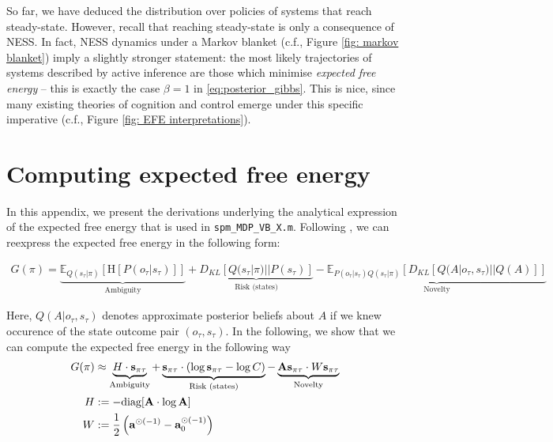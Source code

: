 \documentclass{article}
\begin{document}
So far, we have deduced the distribution over policies of systems that reach steady-state. However, recall that reaching steady-state is only a consequence of NESS. In fact, NESS dynamics under a Markov blanket (c.f., Figure \ref{fig: markov blanket}) imply a slightly stronger statement: the most likely trajectories of systems described by active inference are those which minimise \textit{expected free energy} \cite{parrMarkovBlanketsInformation2019,fristonFreeEnergyPrinciple2019} -- this is exactly the case $\beta =1$ in \eqref{eq:posterior_gibbs}. This is nice, since many existing theories of cognition and control emerge under this specific imperative (c.f., Figure \ref{fig: EFE interpretations}).

\section{Computing expected free energy}
	
	In this appendix, we present the derivations underlying the analytical expression of the expected free energy that is used in \texttt{spm\_MDP\_VB\_X.m}. Following \cite{parrComputationalNeurologyActive2019}, we can reexpress the expected free energy in the following form:
	
	\begin{multline}
	\label{eq: G new expression}
		G(\pi)= \underbrace{\mathbb E_{Q(s_\tau|\pi)} [\text{H}[P(o_\tau |s_\tau)]]}_{\text{Ambiguity}} + \underbrace{D_{KL}[Q(s_\tau |\pi)||P(s_\tau)]}_{\text{Risk (states)}}  
		- \underbrace{\mathbb E_{P(o_\tau |s_\tau)Q(s_\tau|\pi)}[D_{KL}[Q(A|o_\tau,s_\tau)||Q(A)]]}_{\text{Novelty}}
	\end{multline}
	
	 Here, $Q(A|o_\tau,s_\tau)$ denotes approximate posterior beliefs about $A$ if we knew occurence of the state outcome pair $(o_\tau,s_\tau)$. In the following, we show that we can compute the expected free energy in the following way
	 \begin{equation}
	 \label{eq: sol efe computation}
	     \begin{split}
	         G(\pi) &\approx \underbrace{H \cdot \bold s_{\pi \tau}}_{\text{Ambiguity}} + \underbrace{ \bold s_{\pi \tau} \cdot (\log \bold s_{\pi \tau}-\log C)}_{\text{Risk (states)}} - \underbrace{\bold A \bold s_{\pi \tau} \cdot W \bold s_{\pi \tau}}_{\text{Novelty}} \\
             H &:= - \text{diag} [\bold A\cdot \log \bold A] \\
             W &:= \frac 1 2 \left(\bold a ^{\odot (-1)}-\bold a_0^{\odot (-1)}\right)
	     \end{split}
	 \end{equation}
    
\end{document}
